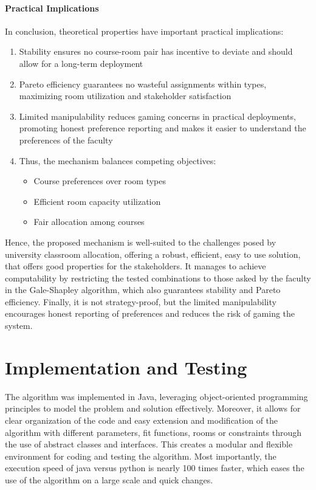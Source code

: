 \documentclass[a4paper, oneside]{article}
\theoremstyle{plain}
\begin{document}
\paragraph{Practical Implications}

In conclusion, theoretical properties have important practical implications:

\begin{enumerate}
	\item Stability ensures no course-room pair has incentive to deviate and should allow for a long-term deployment
	\item Pareto efficiency guarantees no wasteful assignments within types, maximizing room utilization and stakeholder satisfaction
	\item Limited manipulability reduces gaming concerns in practical deployments, promoting honest preference reporting and makes it easier to understand the preferences of the faculty
	\item Thus, the mechanism balances competing objectives:
	      \begin{itemize}
		      \item Course preferences over room types
		      \item Efficient room capacity utilization
		      \item Fair allocation among courses
	      \end{itemize}
\end{enumerate}

Hence, the proposed mechanism is well-suited to the challenges posed by university classroom allocation, offering a robust, efficient, easy to use solution,
that offers good properties for the stakeholders. It manages to achieve computability by restricting the tested combinations to those asked by the faculty
in the Gale-Shapley algorithm, which also guarantees stability and Pareto efficiency. Finally, it is not strategy-proof, but the limited manipulability
encourages honest reporting of preferences and reduces the risk of gaming the system.

\section{Implementation and Testing}

The algorithm was implemented in Java, leveraging object-oriented programming principles to model the problem and solution effectively.
Moreover, it allows for clear organization of the code and easy extension and modification of the algorithm with different parameters, fit functions,
rooms or constraints through the use of abstract classes and interfaces. This creates a modular and flexible environment for coding and testing the algorithm.
Most importantly, the execution speed of java versus python is nearly 100 times faster, which eases the use of the algorithm on a large scale and quick changes.
\end{document}
